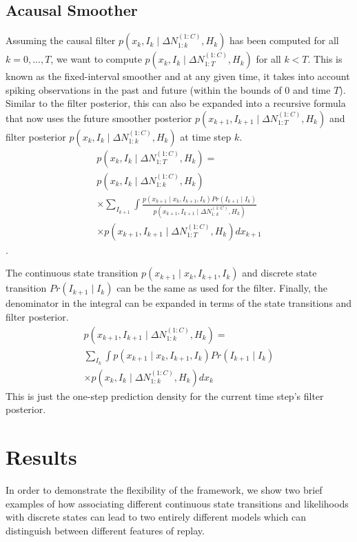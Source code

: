 \documentclass[conference]{IEEEtran}
\begin{document}
\subsection{Acausal Smoother}
Assuming the causal filter $p(x_{k}, I_{k} \mid \Delta N_{1:k}^{(1:C)}, H_{k})$ has been computed for all $k = 0, ..., T$, we want to compute $p(x_{k}, I_{k} \mid \Delta N_{1:T}^{(1:C)}, H_{k})$ for all $k < T$. This is known as the fixed-interval smoother and at any given time, it takes into account spiking observations in the past and future (within the bounds of 0 and time $T$). Similar to the filter posterior, this can also be expanded into a recursive formula that now uses the future smoother posterior $p(x_{k+1}, I_{k+1} \mid \Delta N_{1:T}^{(1:C)}, H_{k})$ and filter posterior $p(x_{k}, I_{k} \mid \Delta N_{1:k}^{(1:C)}, H_{k})$ at time step $k$.
\begin{multline}
p(x_{k}, I_{k} \mid \Delta N_{1:T}^{(1:C)}, H_{k}) = \\
p(x_{k}, I_{k} \mid \Delta N_{1:k}^{(1:C)}, H_{k})\\
\times \sum_{I_{k+1}} \int \frac{p(x_{k+1} \mid x_{k}, I_{k+1}, I_{k})
Pr(I_{k+1} \mid I_{k})}{p(x_{k+1}, I_{k+1} \mid \Delta N_{1:k}^{(1:C)}, H_{k})} \\
\times p(x_{k+1}, I_{k+1} \mid \Delta N_{1:T}^{(1:C)}, H_{k}) dx_{k+1}
\end{multline}.

The continuous state transition $p(x_{k+1} \mid x_{k}, I_{k+1}, I_{k})$ and discrete state transition $Pr(I_{k+1} \mid I_{k})$ can be the same as used for the filter. Finally, the denominator in the integral can be expanded in terms of the state transitions and filter posterior.
\begin{multline}
p(x_{k+1}, I_{k+1} \mid \Delta N_{1:k}^{(1:C)}, H_{k}) = \\
\sum_{I_{k}} \int p(x_{k+1} \mid x_{k}, I_{k+1}, I_{k}) Pr(I_{k+1} \mid I_{k}) \\
\times p(x_{k}, I_{k} \mid \Delta N_{1:k}^{(1:C)}, H_{k}) dx_{k}
\end{multline}
This is just the one-step prediction density for the current time step's filter posterior.

\section{Results}
In order to demonstrate the flexibility of the framework, we show two brief examples of how associating different continuous state transitions and likelihoods with discrete states can lead to two entirely different models which can distinguish between different features of replay.
\end{document}
